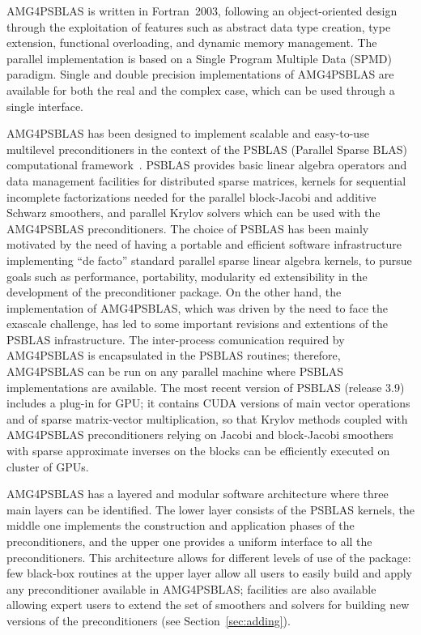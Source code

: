 AMG4PSBLAS is written in Fortran~2003, following an
object-oriented design through the exploitation of features
such as abstract data type creation, type extension, functional overloading, and
dynamic memory management.
The parallel implementation is based on a Single Program Multiple Data
(SPMD) paradigm.  Single and
double precision implementations of AMG4PSBLAS are available for both the
real and the complex case, which can be used through a single
interface.

AMG4PSBLAS has been designed to implement scalable and easy-to-use
multilevel preconditioners in the context of the PSBLAS (Parallel Sparse BLAS)
computational framework~\cite{psblas_00,PSBLAS3}. PSBLAS provides basic linear algebra
operators and data management facilities for distributed sparse matrices,
kernels for sequential incomplete factorizations needed for the
parallel block-Jacobi and additive Schwarz smoothers, and 
parallel Krylov solvers which can be used with the AMG4PSBLAS preconditioners.
The choice of PSBLAS has been mainly motivated by the need of having
a portable and efficient software infrastructure implementing ``de facto'' standard
parallel sparse linear algebra kernels, to pursue goals such as performance,
portability, modularity ed extensibility in the development of the preconditioner
package. On the other hand, the implementation of AMG4PSBLAS, which
was driven by the need to face the exascale challenge, has led to some
important  revisions and extentions of the PSBLAS infrastructure. 
The inter-process comunication required by AMG4PSBLAS is encapsulated
in the PSBLAS routines;
therefore, AMG4PSBLAS can be run on any parallel machine where PSBLAS 
implementations are available.  The most recent version of PSBLAS 
(release 3.9) includes  a plug-in for GPU; it contains CUDA
versions of main vector operations and of sparse matrix-vector
multiplication, so that Krylov methods coupled with AMG4PSBLAS
preconditioners    relying on Jacobi and block-Jacobi smoothers with 
sparse approximate inverses on the blocks can be efficiently executed 
on cluster of GPUs. 

AMG4PSBLAS has a layered and modular software architecture where three
main layers can be identified.  The lower layer consists of the PSBLAS
kernels, the middle one implements the construction and application
phases of the preconditioners, and the upper one provides a uniform
interface to all the preconditioners. This architecture allows for
different levels of use of the package: few black-box routines at the
upper layer allow all users to easily build and apply any
preconditioner available in AMG4PSBLAS; facilities are also available
allowing expert users to extend the set of smoothers and solvers for
building new versions of the preconditioners (see
Section~\ref{sec:adding}). 

